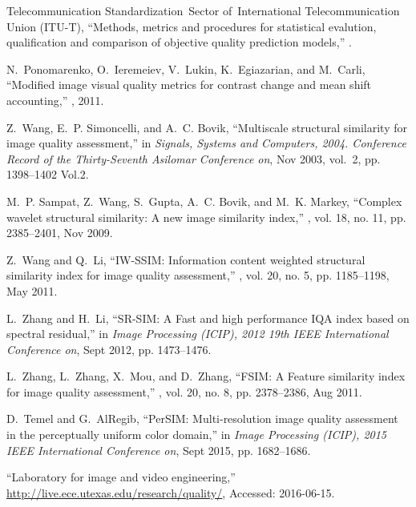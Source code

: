 \documentclass[draftcls,12pt, onecolumn]{IEEEtran}
\begin{document}
\begin{thebibliography}{10}
Telecommunication Standardization~Sector of~International Telecommunication
  Union (ITU-T),
\newblock ``{Methods, metrics and procedures for statistical evalution,
  qualification and comparison of objective quality prediction models},''
.

N.~Ponomarenko, O.~Ieremeiev, V.~Lukin, K.~Egiazarian, and M.~Carli,
\newblock ``{Modified image visual quality metrics for contrast change and mean
  shift accounting},''
, 2011.

Z.~Wang, E.~P. Simoncelli, and A.~C. Bovik,
\newblock ``Multiscale structural similarity for image quality assessment,''
\newblock in {\em Signals, Systems and Computers, 2004. Conference Record of
  the Thirty-Seventh Asilomar Conference on}, Nov 2003, vol.~2, pp. 1398--1402
  Vol.2.

M.~P. Sampat, Z.~Wang, S.~Gupta, A.~C. Bovik, and M.~K. Markey,
\newblock ``Complex wavelet structural similarity: A new image similarity
  index,''
, vol. 18, no. 11, pp.
  2385--2401, Nov 2009.

Z.~Wang and Q.~Li,
\newblock ``{IW-SSIM: Information content weighted structural similarity index
  for image quality assessment},''
, vol. 20, no. 5, pp.
  1185--1198, May 2011.

L.~Zhang and H.~Li,
\newblock ``{SR-SIM: A Fast and high performance IQA index based on spectral
  residual},''
\newblock in {\em Image Processing (ICIP), 2012 19th IEEE International
  Conference on}, Sept 2012, pp. 1473--1476.

L.~Zhang, L.~Zhang, X.~Mou, and D.~Zhang,
\newblock ``{FSIM: A Feature similarity index for image quality assessment},''
, vol. 20, no. 8, pp.
  2378--2386, Aug 2011.

D.~Temel and G.~AlRegib,
\newblock ``{PerSIM: Multi-resolution image quality assessment in the
  perceptually uniform color domain},''
\newblock in {\em Image Processing (ICIP), 2015 IEEE International Conference
  on}, Sept 2015, pp. 1682--1686.

``Laboratory for image and video engineering,''
  \url{http://live.ece.utexas.edu/research/quality/},
\newblock Accessed: 2016-06-15.

\end{thebibliography}
\end{document}
